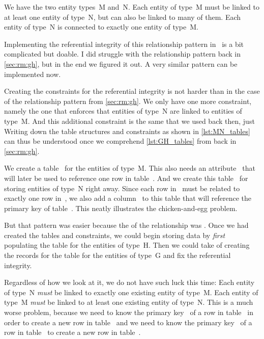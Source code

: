 %
%
\label{sec:rm:mn}%
%
%
%
%
We have the two entity types~M and~N.
Each entity of type~M must be linked to at least one entity of type~N, but can also be linked to many of them.
Each entity of type~N is connected to exactly one entity of type~M.

Implementing the referential integrity of this relationship pattern in \sql\ is a bit complicated but doable.
I did struggle with the  relationship pattern back in \cref{sec:rm:gh}, but in the end we figured it out.
A very similar pattern can be implemented now.

Creating the constraints for the referential integrity is not harder than in the case of the  relationship pattern from \cref{sec:rm:gh}.
We only have one more constraint, namely the one that enforces that entities of type~N are linked to entities of type~M.
And this additional constraint is the same that we used back then, just 
Writing down the table structures and constraints as shown in \cref{lst:MN_tables} can thus be understood once we comprehend \cref{lst:GH_tables} from back in \cref{sec:rm:gh}.

We create a table~ for the entities of type~M.
This also needs an attribute~ that will later be used to reference one row in table~.
And we create this table~ for storing entities of type~N right away.
Since each row in~ must be related to exactly one row in~, we also add a column~ to this table that will reference the primary key of table~.
This neatly illustrates the chicken-and-egg problem.

But that pattern was easier because the  of the relationship was .
Once we had created the tables and constraints, we could begin storing data by \emph{first} populating the table for the entities of type~H.
Then we could take of creating the records for the table for the entities of type~G and fix the referential integrity.

Regardless of how we look at it, we do not have such luck this time:
Each entity of type~N \emph{must} be linked to exactly one existing entity of type~M.
Each entity of type~M \emph{must} be linked to at least one existing entity of type~N.
This is a much worse problem, because we need to know the primary key~ of a row in table~ in order to create a new row in table~ and we need to know the primary key~ of a row in table~ to create a new row in table~.
%
\FloatBarrier%
\endhsection%
%
